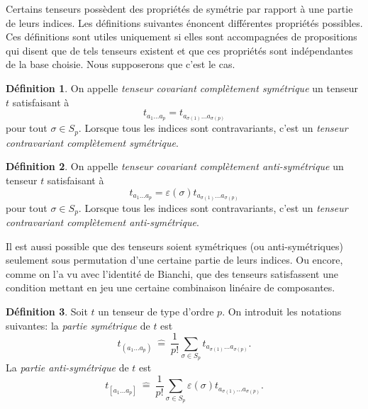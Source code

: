 \documentclass[a4paper,11pt]{report}
\theoremstyle{definition}
\theoremstyle{plain}
\theoremstyle{definition}
\newtheorem{defn}{Définition}[chapter]
\theoremstyle{remark}
\begin{document}
                Certains tenseurs possèdent des propriétés de symétrie par rapport à une partie de leurs indices. Les définitions suivantes énoncent différentes propriétés possibles. Ces définitions sont utiles uniquement si elles sont accompagnées de propositions qui disent que de tels tenseurs existent et que ces propriétés sont indépendantes de la base choisie. Nous supposerons que c'est le cas.
                
                \begin{defn}
                    On appelle \textit{tenseur covariant complètement symétrique} un tenseur $t$ satisfaisant à
                    \begin{equation}
                            t_{a_1\dots a_p} = t_{a_{\sigma(1)}\dots a_{\sigma(p)}}
                    \end{equation}
                    pour tout $\sigma\in S_p$. Lorsque tous les indices sont contravariants, c'est un \textit{tenseur contravariant complètement symétrique}.
                \end{defn}
                
                \begin{defn}
                    On appelle \textit{tenseur covariant complètement anti-symétrique} un tenseur $t$ satisfaisant à
                    \begin{equation}
                            t_{a_1\dots a_p} = \varepsilon(\sigma)t_{a_{\sigma(1)}\dots a_{\sigma(p)}}
                    \end{equation}
                    pour tout $\sigma\in S_p$. Lorsque tous les indices sont contravariants, c'est un \textit{tenseur contravariant complètement anti-symétrique}.
                \end{defn}
                
                Il est aussi possible que des tenseurs soient symétriques (ou anti-symétriques) seulement sous permutation d'une certaine partie de leurs indices. Ou encore, comme on l'a vu avec l'identité de Bianchi, que des tenseurs satisfassent une condition mettant en jeu une certaine combinaison linéaire de composantes.\\
                
                \begin{defn}
                    Soit $t$ un tenseur de type d'ordre $p$. On introduit les notations suivantes: la \textit{partie symétrique} de $t$ est 
                    \begin{equation}
                        t_{(a_1\dots a_p)} ~\hat{=}~ \frac{1}{p!} \sum_{\sigma\in S_p}t_{a_{\sigma(1)}\dots a_{\sigma(p)}}.
                    \end{equation}
                    La \textit{partie anti-symétrique} de $t$ est 
                    \begin{equation}
                        t_{[a_1\dots a_p]} ~\hat{=}~ \frac{1}{p!} \sum_{\sigma\in S_p}\varepsilon(\sigma) t_{a_{\sigma(1)}\dots a_{\sigma(p)}}.
                    \end{equation}
                 \end{defn}
                
\end{document}
